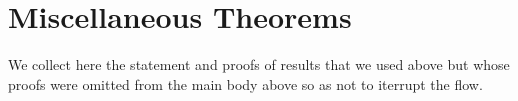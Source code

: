 
\newpage

\section{Miscellaneous Theorems}
We collect here the statement and proofs of results that we used above but whose
proofs were omitted from the main body above so as not to iterrupt the flow.


